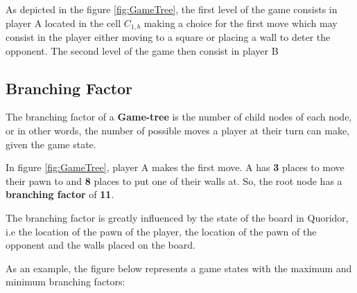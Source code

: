 As depicted in the figure \ref{fig:GameTree}, the first level of the game consists in player A located in the cell $C_{1, b}$ making a choice for the first move which may consist in the player either moving to a square or placing a wall to deter the opponent. The second level of the game then consist in player B  


\subsection{Branching Factor}
\label{BranchingFactor}

The branching factor of a \textbf{Game-tree} is the number of child nodes of each node, or in other words, the number of possible moves a player at their turn can make, given the game state.

In figure \ref{fig:GameTree}, player A makes the first move. A has \textbf{3} places to move their pawn to and \textbf{8} places to put one of their walls at. So, the root node has a \textbf{branching factor} of \textbf{11}.

The branching factor is greatly influenced by the state of the board in Quoridor, i.e the location of the pawn of the player, the location of the pawn of the opponent and the walls placed on the board.

As an example, the figure below represents a game states with the maximum and minimum branching factors:

